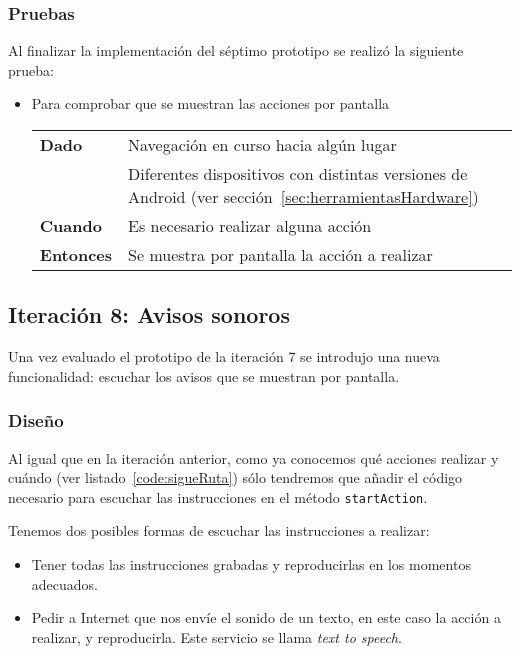 \subsubsection{Pruebas}

Al finalizar la implementación del séptimo prototipo se realizó la siguiente prueba:

\begin{itemize}
  \item Para comprobar que se muestran las acciones por pantalla

  \begin{tabular}{p{}p{}}
    \hline
    \textbf{Dado}     & Navegación en curso hacia algún lugar \\
                      & Diferentes dispositivos con distintas versiones de Android (ver
                        sección~\ref{sec:herramientasHardware}) \\
    \textbf{Cuando}   & Es necesario realizar alguna acción \\
    \textbf{Entonces} & Se muestra por pantalla la acción a realizar \\
    \hline
  \end{tabular}
\end{itemize}

\subsection{Iteración 8: Avisos sonoros}
\label{sec:ite8}

Una vez evaluado el prototipo de la iteración 7 se introdujo una nueva funcionalidad: escuchar los
avisos que se muestran por pantalla.

\subsubsection{Diseño}

Al igual que en la iteración anterior, como ya conocemos qué acciones realizar y cuándo (ver
listado~\ref{code:sigueRuta}) sólo tendremos que añadir el código necesario para escuchar las
instrucciones en el método \texttt{startAction}.

Tenemos dos posibles formas de escuchar las instrucciones a realizar:

\begin{itemize}
  \item Tener todas las instrucciones grabadas y reproducirlas en los momentos adecuados.
  \item Pedir a Internet que nos envíe el sonido de un texto, en este caso la acción a realizar, y
    reproducirla. Este servicio se llama \emph{text to speech}.
\end{itemize}

